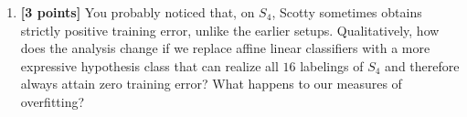 \begin{enumerate}
\begin{tcolorbox}[height=6cm, width=\linewidth]

\end{tcolorbox}



\item {\bf [3 points]}
You probably noticed that, on $S_4$, Scotty sometimes obtains strictly positive
training error, unlike the earlier setups.  Qualitatively, how does the
analysis change if we replace affine linear classifiers with a more expressive
hypothesis class that can realize all $16$ labelings of $S_4$ and therefore
always attain zero training error?  What happens to our measures of overfitting?
\begin{tcolorbox}[height=5cm, width=\linewidth]

\end{tcolorbox}



\end{enumerate}




\newpage
